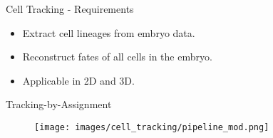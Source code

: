 \begin{frame}{Cell Tracking - Requirements}
    \begin{itemize}
          \item Extract cell lineages from embryo data.
          \item Reconstruct fates of all cells in the embryo.
          \item Applicable in 2D and 3D.
    \end{itemize}
\end{frame}


\begin{frame}{Tracking-by-Assignment}
    \begin{figure}
        \centering
        \texttt{[image: images/cell\_tracking/pipeline\_mod.png]}
        \label{fig:chaingraph-pipeline}
    \end{figure}
\end{frame}

